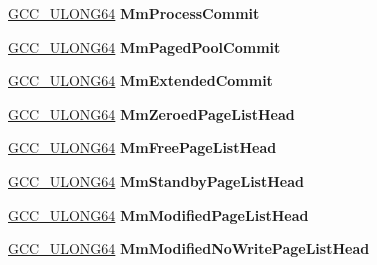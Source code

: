 \begin{DoxyCompactItemize}
\hyperlink{union___g_c_c___u_l_o_n_g64}{G\+C\+C\+\_\+\+U\+L\+O\+N\+G64} {\bfseries Mm\+Process\+Commit}
\item 
\mbox{\label{struct___k_d_d_e_b_u_g_g_e_r___d_a_t_a64_a0b39b35240ad827faee7d3175b802b20}} 
\hyperlink{union___g_c_c___u_l_o_n_g64}{G\+C\+C\+\_\+\+U\+L\+O\+N\+G64} {\bfseries Mm\+Paged\+Pool\+Commit}
\item 
\mbox{\label{struct___k_d_d_e_b_u_g_g_e_r___d_a_t_a64_a67cb5243aec9993bc6da5277a41f7f61}} 
\hyperlink{union___g_c_c___u_l_o_n_g64}{G\+C\+C\+\_\+\+U\+L\+O\+N\+G64} {\bfseries Mm\+Extended\+Commit}
\item 
\mbox{\label{struct___k_d_d_e_b_u_g_g_e_r___d_a_t_a64_ad321a8f4a260387fae137a5fec8b4158}} 
\hyperlink{union___g_c_c___u_l_o_n_g64}{G\+C\+C\+\_\+\+U\+L\+O\+N\+G64} {\bfseries Mm\+Zeroed\+Page\+List\+Head}
\item 
\mbox{\label{struct___k_d_d_e_b_u_g_g_e_r___d_a_t_a64_a8ee24ace9ff33e46d4947cb3415b5187}} 
\hyperlink{union___g_c_c___u_l_o_n_g64}{G\+C\+C\+\_\+\+U\+L\+O\+N\+G64} {\bfseries Mm\+Free\+Page\+List\+Head}
\item 
\mbox{\label{struct___k_d_d_e_b_u_g_g_e_r___d_a_t_a64_a881c412fa0f3dec503aa5e09b61b4534}} 
\hyperlink{union___g_c_c___u_l_o_n_g64}{G\+C\+C\+\_\+\+U\+L\+O\+N\+G64} {\bfseries Mm\+Standby\+Page\+List\+Head}
\item 
\mbox{\label{struct___k_d_d_e_b_u_g_g_e_r___d_a_t_a64_a64aa7da265919997256d7083d051ba7e}} 
\hyperlink{union___g_c_c___u_l_o_n_g64}{G\+C\+C\+\_\+\+U\+L\+O\+N\+G64} {\bfseries Mm\+Modified\+Page\+List\+Head}
\item 
\mbox{\label{struct___k_d_d_e_b_u_g_g_e_r___d_a_t_a64_aae86c1cbdc9e17ec9286c6eb49c08442}} 
\hyperlink{union___g_c_c___u_l_o_n_g64}{G\+C\+C\+\_\+\+U\+L\+O\+N\+G64} {\bfseries Mm\+Modified\+No\+Write\+Page\+List\+Head}
\item 
\mbox{\label{struct___k_d_d_e_b_u_g_g_e_r___d_a_t_a64_a00511c90b4a04f2e687dcbdeda360cb9}} 

\end{DoxyCompactItemize}

